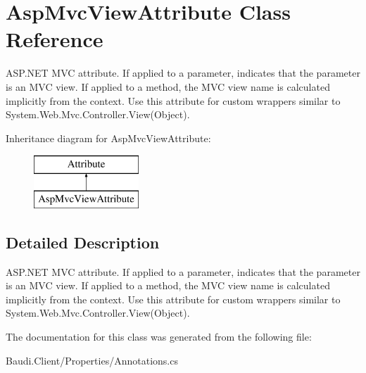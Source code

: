 \hypertarget{class_asp_mvc_view_attribute}{}\section{Asp\+Mvc\+View\+Attribute Class Reference}
\label{class_asp_mvc_view_attribute}


A\+S\+P.\+N\+E\+T M\+V\+C attribute. If applied to a parameter, indicates that the parameter is an M\+V\+C view. If applied to a method, the M\+V\+C view name is calculated implicitly from the context. Use this attribute for custom wrappers similar to {\ttfamily System.\+Web.\+Mvc.\+Controller.\+View(\+Object)}.  


Inheritance diagram for Asp\+Mvc\+View\+Attribute\+:\begin{figure}[H]
\begin{center}
\leavevmode
\includegraphics[height=2.000000cm]{class_asp_mvc_view_attribute}
\end{center}
\end{figure}


\subsection{Detailed Description}
A\+S\+P.\+N\+E\+T M\+V\+C attribute. If applied to a parameter, indicates that the parameter is an M\+V\+C view. If applied to a method, the M\+V\+C view name is calculated implicitly from the context. Use this attribute for custom wrappers similar to {\ttfamily System.\+Web.\+Mvc.\+Controller.\+View(\+Object)}. 



The documentation for this class was generated from the following file\+:\begin{DoxyCompactItemize}
\item 
Baudi.\+Client/\+Properties/Annotations.\+cs\end{DoxyCompactItemize}
